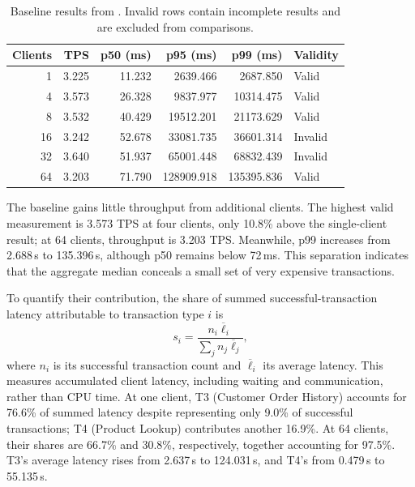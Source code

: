 \begin{table}[htbp]
  \centering
  \begin{tabular}{@{}rrrrrl@{}}
    \toprule
    Clients & TPS & p50 (ms) & p95 (ms) & p99 (ms) & Validity \\
    \midrule
     1 & 3.225 & 11.232 &   2639.466 &   2687.850 & Valid \\
     4 & 3.573 & 26.328 &   9837.977 &  10314.475 & Valid \\
     8 & 3.532 & 40.429 &  19512.201 &  21173.629 & Valid \\
    16 & 3.242 & 52.678 &  33081.735 &  36601.314 & Invalid \\
    32 & 3.640 & 51.937 &  65001.448 &  68832.439 & Invalid \\
    64 & 3.203 & 71.790 & 128909.918 & 135395.836 & Valid \\
    \bottomrule
  \end{tabular}
  \caption{Baseline results from . Invalid rows contain incomplete
  results and are excluded from comparisons.}
  \label{tab:a0-results}
\end{table}

The baseline gains little throughput from additional clients.
The highest valid measurement is 3.573 TPS at four clients, only
10.8\% above the single-client result; at 64 clients, throughput is
3.203 TPS. Meanwhile, p99 increases from 2.688\,s to 135.396\,s,
although p50 remains below 72\,ms. This separation indicates that
the aggregate median conceals a small set of very expensive transactions.

To quantify their contribution, the share of summed successful-transaction
latency attributable to transaction type \(i\) is
\[
  s_i =
  \frac{n_i\overline{\ell}_i}
       {\sum_j n_j\overline{\ell}_j},
\]
where \(n_i\) is its successful transaction count and
\(\overline{\ell}_i\) its average latency.
This measures accumulated client latency, including waiting and
communication, rather than CPU time.
At one client, T3 (Customer Order History) accounts for 76.6\% of
summed latency despite representing only 9.0\% of successful transactions;
T4 (Product Lookup) contributes another 16.9\%.
At 64 clients, their shares are 66.7\% and 30.8\%, respectively,
together accounting for 97.5\%.
T3's average latency rises from 2.637\,s to 124.031\,s, and T4's
from 0.479\,s to 55.135\,s.


